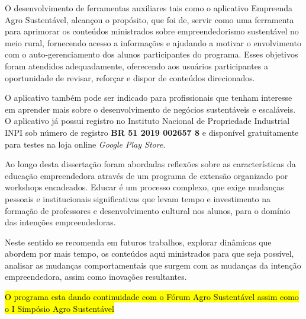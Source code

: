 O desenvolvimento de ferramentas auxiliares tais como o aplicativo Empreenda Agro Sustentável, alcançou o propósito, que foi de, servir como uma ferramenta para aprimorar os conteúdos ministrados sobre empreendedorismo sustentável no meio rural, fornecendo acesso a informações e ajudando a motivar o envolvimento com o auto-gerenciamento dos alunos participantes do programa. Esses objetivos foram atendidos adequadamente, oferecendo aos usuários participantes a oportunidade de revisar, reforçar e dispor de conteúdos direcionados.

O aplicativo também pode ser indicado para profissionais que tenham interesse em aprender mais sobre o desenvolvimento de negócios sustentáveis e escaláveis. O aplicativo já possui registro no Instituto Nacional de Propriedade Industrial INPI sob número de registro \textbf{BR 51 2019 002657 8} e disponível gratuitamente para testes na loja online \textit{Google Play Store}.

Ao longo desta dissertação foram abordadas reflexões sobre as características da educação empreendedora através de um programa de extensão organizado por workshops encadeados. Educar é um processo complexo, que exige mudanças pessoais e institucionais significativas que levam tempo e investimento na formação de professores e desenvolvimento cultural nos alunos, para o domínio das intenções empreendedoras.

Neste sentido se recomenda em futuros trabalhos, explorar dinâmicas que abordem por mais tempo, os conteúdos aqui ministrados para que seja possível, analisar as mudanças comportamentais que surgem com as mudanças da intenção empreendedora, assim como inovações resultantes.

\hl{O programa esta dando continuidade com o Fórum Agro Sustentável assim como o I Simpósio Agro Sustentável}